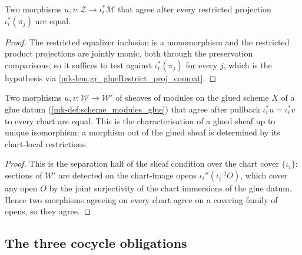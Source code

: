 \begin{lemma}\label{mk-lem:gr_glueRestrict_hom_ext}
  \leanok

  Two morphisms \(u, v : \mathcal{Z} \to \iota_i^{*}\mathcal{M}\) that agree after every
  restricted projection \(\iota_i^{*}(\pi_j)\) are equal.
\end{lemma}
\begin{proof}
  \leanok
  The restricted equalizer inclusion is a monomorphism and the restricted product
  projections are jointly monic, both through the preservation comparisons; so it
  suffices to test against \(\iota_i^{*}(\pi_j)\) for every \(j\), which is the
  hypothesis via \ref{mk-lem:gr_glueRestrict_proj_compat}.
\end{proof}

\begin{lemma}\label{mk-lem:gr_modules_glue_unique}
  \leanok

  Two morphisms \(u, v : \mathcal{W} \to \mathcal{W}'\) of sheaves of modules on the glued
  scheme \(X\) of a glue datum (\ref{mk-def:scheme_modules_glue}) that agree after pullback
  \(\iota_i^{*}u = \iota_i^{*}v\) to every chart are equal. This is the characterisation of a
  glued sheaf up to unique isomorphism: a morphism out of the glued sheaf is determined by its
  chart-local restrictions.
\end{lemma}
\begin{proof}
  \leanok
  This is the separation half of the sheaf condition over the chart cover \(\{\iota_i\}\):
  sections of \(\mathcal{W}'\) are detected on the chart-image opens \(\iota_i''(\iota_i^{-1}O)\),
  which cover any open \(O\) by the joint surjectivity of the chart immersions of the glue
  datum. Hence two morphisms agreeing on every chart agree on a covering family of opens, so
  they agree.
\end{proof}

\subsection{The three cocycle obligations}

